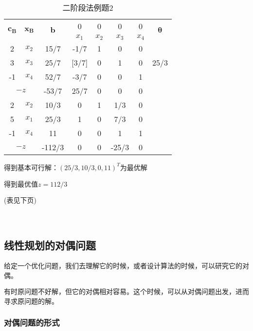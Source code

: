 \documentclass{book}
\begin{document}
\begin{table}[h]
    \centering
        \begin{tabular}{c|c|c|cccc|c}
            \hline
             \multirow{2}{*}{$\boldsymbol{c_B}$}& \multirow{2}{*}{$\boldsymbol{x_B}$} & \multirow{2}{*}{$\boldsymbol{b}$} & 0 & 0 & 0 & 0 & \multirow{2}{*}{$\boldsymbol{\theta}$} \\
             \cline{4-7}
             &&& $x_1$ & $x_2$ & $x_3$ & $x_4$ &\\
             \hline
             2 & $x_2$ & 15/7 & -1/7 & 1 & 0 & 0 & \\
             3 & $x_3$ & 25/7 & [3/7] & 0 & 1 & 0 & 25/3\\
             -1 & $x_4$ & 52/7 & -3/7 & 0 & 0 & 1 & \\
             \hline
             \multicolumn{2}{c|}{$-z$}  & -53/7 & 25/7 & 0 & 0 & 0 &\\
             \hline
             2 & $x_2$ & 10/3 & 0 & 1 & 1/3 & 0 & \\
             5 & $x_1$ & 25/3 & 1 & 0 & 7/3 & 0 & \\
             -1 & $x_4$ & 11 & 0 & 0 & 1 & 1 & \\
             \hline
             \multicolumn{2}{c|}{$-z$}  & -112/3 & 0 & 0 & -25/3 & 0 &\\
             \hline
        \end{tabular}
        \caption{二阶段法例题2}
        \label{tab:example de two-phase method2}
\end{table}
    得到基本可行解：$(25/3,10/3,0,11)^T$为最优解
    
    得到最优值$z=112/3$

    (表见下页)
\\
\\
\\

\subsection{线性规划的对偶问题}

给定一个优化问题，我们去理解它的时候，或者设计算法的时候，可以研究它的对偶。

有时原问题不好解，但它的对偶相对容易。这个时候，可以从对偶问题出发，进而寻求原问题的解。

\subsubsection{对偶问题的形式}
\end{document}
